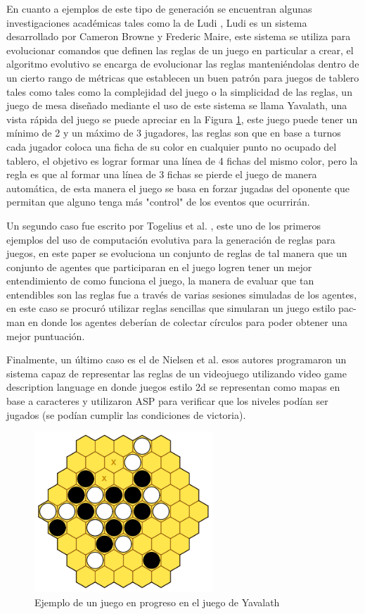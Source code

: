 En cuanto a ejemplos de este tipo de generación se encuentran algunas
investigaciones académicas tales como la de Ludi \cite{Browne2010}, Ludi es un
sistema desarrollado por Cameron Browne y Frederic Maire, este sistema se
utiliza para evolucionar comandos que definen las reglas de un juego en
particular a crear, el algoritmo evolutivo se encarga de evolucionar las reglas
manteniéndolas dentro de un cierto rango de métricas que establecen un buen
patrón para juegos de tablero tales como tales como la complejidad del juego o
la simplicidad de las reglas, un juego de mesa diseñado mediante el uso de este
sistema se llama Yavalath, una vista rápida del juego se puede apreciar en la
Figura \ref{figure:Yavalath}, este juego puede tener un mínimo de 2 y un máximo
de 3 jugadores, las reglas son que en base a turnos cada jugador coloca una
ficha de su color en cualquier punto no ocupado del tablero, el objetivo es
lograr formar una línea de 4 fichas del mismo color, pero la regla es que al
formar una línea de 3 fichas se pierde el juego de manera automática, de esta
manera el juego se basa en forzar jugadas del oponente que permitan que alguno
tenga más "control" de los eventos que ocurrirán. 

Un segundo caso fue escrito por Togelius et al. \cite{Togelius2008}, este uno de
los primeros ejemplos del uso de computación evolutiva para la generación de
reglas para juegos, en este paper se evoluciona un conjunto de reglas de tal
manera que un conjunto de agentes que participaran en el juego logren tener un
mejor entendimiento de como funciona el juego, la manera de evaluar que tan
entendibles son las reglas fue a través de varias sesiones simuladas de los
agentes, en este caso se procuró utilizar reglas sencillas que simularan un
juego estilo pac-man en donde los agentes deberían de colectar círculos para
poder obtener una mejor puntuación.

Finalmente, un último caso es el de Nielsen et al. \cite{Nielsen2015} esos
autores programaron un sistema capaz de representar las reglas de un videojuego
utilizando video game description language en donde juegos estilo 2d se
representan como mapas en base a caracteres y utilizaron ASP para verificar que
los niveles podían ser jugados (se podían cumplir las condiciones de victoria).

\begin{figure}
    \centering
    \includegraphics[width=0.6\textwidth]{img/Yavalath.png}
    \caption{Ejemplo de un juego en progreso en el juego de Yavalath}
    \label{figure:Yavalath}
\end{figure}

